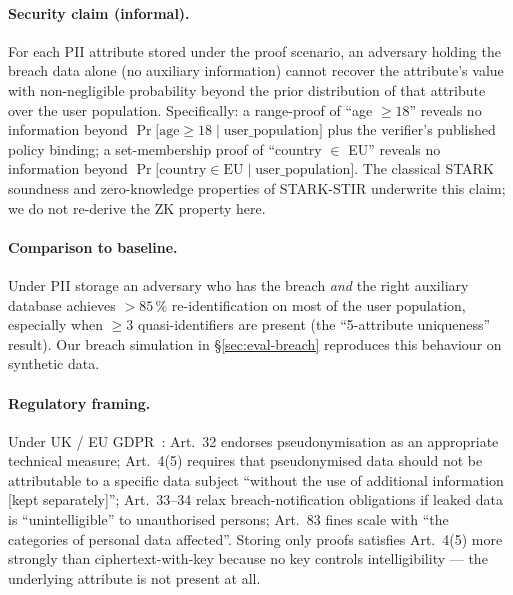 \documentclass[11pt,a4paper]{article}
\begin{document}
\paragraph{Security claim (informal).}  For each PII attribute
stored under the proof scenario, an adversary holding the breach
data alone (no auxiliary information) cannot recover the
attribute's value with non\nobreakdash-negligible probability beyond
the prior distribution of that attribute over the user population.
Specifically: a range\nobreakdash-proof of ``age $\geq 18$'' reveals no
information beyond
$\Pr\bigl[\mathrm{age} \geq 18 \mid \mathrm{user\_population}\bigr]$
plus the verifier's published policy binding; a
set\nobreakdash-membership proof of ``country $\in$ EU'' reveals no
information beyond
$\Pr\bigl[\mathrm{country} \in \mathrm{EU} \mid \mathrm{user\_population}\bigr]$.
The classical STARK soundness and zero\nobreakdash-knowledge properties
of STARK\nobreakdash-STIR \cite{stark-stir} underwrite this claim; we
do not re\nobreakdash-derive the ZK property here.

\paragraph{Comparison to baseline.}  Under PII storage an
adversary who has the breach \emph{and} the right auxiliary
database achieves $>85\,\%$ re\nobreakdash-identification on most of
the user population, especially when $\geq 3$ quasi\nobreakdash-identifiers
are present (the \cite{sweeney2000simple} ``5\nobreakdash-attribute
uniqueness'' result).  Our breach simulation in
\S\ref{sec:eval-breach} reproduces this behaviour on synthetic
data.

\paragraph{Regulatory framing.}  Under UK / EU
GDPR~\cite{gdpr,uk-gdpr}: Art.~32 endorses pseudonymisation as an
appropriate technical measure; Art.~4(5) requires that pseudonymised
data should not be attributable to a specific data subject ``without
the use of additional information [kept separately]''; Art.~33--34
relax breach\nobreakdash-notification obligations if leaked data is
``unintelligible'' to unauthorised persons; Art.~83 fines scale with
``the categories of personal data affected''.  Storing only
proofs satisfies Art.~4(5) more strongly than ciphertext\nobreakdash-with\nobreakdash-key
because no key controls intelligibility — the underlying attribute
is not present at all.
\end{document}
